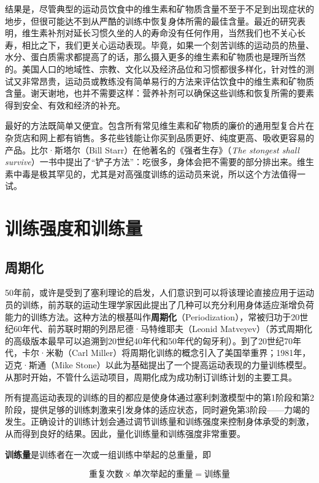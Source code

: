 结果是，尽管典型的运动员饮食中的维生素和矿物质含量不至于不足到出现症状的地步，但很可能达不到从严酷的训练中恢复身体所需的最佳含量。最近的研究表明，维生素补剂对延长习惯久坐的人的寿命没有任何作用，当然我们也不关心长寿，相比之下，我们更关心运动表现。毕竟，如果一个刻苦训练的运动员的热量、水分、蛋白质需求都提高了的话，那么摄入更多的维生素和矿物质也是理所当然的。美国人口的地域性、宗教、文化以及经济品位和习惯都很多样化，针对性的测试又非常昂贵，运动员或教练没有简单易行的方法来评估饮食中的维生素和矿物质含量。谢天谢地，也并不需要这样：营养补剂可以确保这些训练和恢复所需的要素得到安全、有效和经济的补充。

最好的方法既简单又便宜。包含所有常见维生素和矿物质的廉价的通用型复合片在杂货店和网上都有销售。多花些钱能让你买到品质更好、纯度更高、吸收更容易的产品。比尔·斯塔尔（Bill Starr）在他著名的《强者生存》（\textit{The stongest shall survive}）一书中提出了“铲子方法”：吃很多，身体会把不需要的部分排出来。维生素中毒是极其罕见的，尤其是对高强度训练的运动员来说，所以这个方法值得一试。

\section{训练强度和训练量}

\subsection{周期化}

50年前，或许是受到了塞利理论的启发，人们意识到可以将该理论直接应用于运动员的训练，前苏联的运动生理学家因此提出了几种可以充分利用身体适应渐增负荷能力的训练方法。这种方法的根基叫作\textbf{周期化}（Periodization），常被归功于20世纪60年代、前苏联时期的列昂尼德·马特维耶夫（Leonid Matveyev）（苏式周期化的高级版本最早可以追溯到20世纪40年代和50年代的匈牙利）。到了20世纪70年代，卡尔·米勒（Carl Miller）将周期化训练的概念引入了美国举重界；1981年，迈克·斯通（Mike Stone）以此为基础提出了一个提高运动表现的力量训练模型。从那时开始，不管什么运动项目，周期化成为成功制订训练计划的主要工具。

所有提高运动表现的训练的目的都应是使身体通过塞利刺激模型中的第1阶段和第2阶段，提供足够的训练刺激来引发身体的适应状态，同时避免第3阶段——力竭的发生。正确设计的训练计划会通过调节训练量和训练强度来控制身体承受的刺激，从而得到良好的结果。因此，量化训练量和训练强度非常重要。

\textbf{训练量}是训练者在一次或一组训练中举起的总重量，即

$$\text{重复次数}\times \text{单次举起的重量} = \text{训练量}$$

